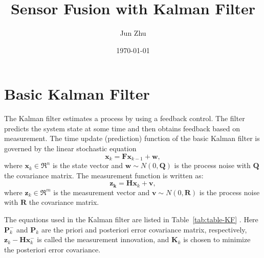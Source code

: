 \documentclass[12pt]{article}
\title{Sensor Fusion with Kalman Filter}
\author{Jun Zhu}
\date{\today}
\begin{document}
\maketitle


\section{Basic Kalman Filter}\label{basic-kalman-filter}

The Kalman filter estimates a process by using a feedback control. The filter predicts the system state at some time and then obtains feedback based on measurement. The time update (prediction) function of the basic Kalman filter is governed by the linear stochastic equation
%
\begin{equation}
	\mathbf{x}_{k} = \mathbf{F}\mathbf{x}_{k - 1} + \mathbf{w},
\end{equation}
%
where \(\mathbf{x}_{k} \in \mathfrak{R}^{n}\) is the state vector and \(\mathbf{w}\sim N( 0,\mathbf{Q})\) is the process noise with \(\mathbf{Q}\) the covariance matrix. The measurement function is written as:
%
\begin{equation}
	\mathbf{z}_{\mathbf{k}} = \mathbf{H}\mathbf{x}_{k} + \mathbf{v},
\end{equation}
%
where \(\mathbf{z}_{k} \in \mathfrak{R}^{m}\) is the measurement vector and \(\mathbf{v}\sim N( 0,\mathbf{R})\) is the process noise with \(\mathbf{R}\) the covariance matrix.

The equations used in the Kalman filter are listed in Table~\ref{tab:table-KF} \cite{Welch}. Here \(\mathbf{P}_{k}^{-}\) and \(\mathbf{P}_{k}\) are the priori and posteriori error covariance matrix, respectively, \(\mathbf{z}_{k} - \mathbf{H}\mathbf{x}_{k}^{-}\) is called the measurement innovation, and \(\mathbf{K}_{k}\) is chosen to minimize the posteriori error covariance.
\end{document}
